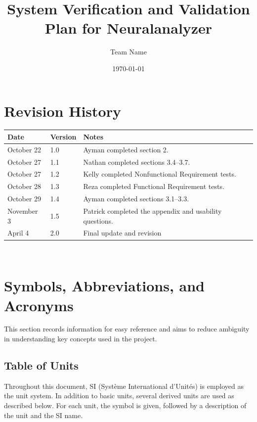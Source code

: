 \documentclass[12pt, titlepage]{article}
\newcommand{\progname}{Neuralanalyzer}
\newcommand{\authname}{Team Name}
\begin{document}
\title{System Verification and Validation Plan for \progname{}} 
\author{\authname}
\date{\today}
	
\maketitle


\section*{Revision History}

\begin{tabularx}{\textwidth}{p{3cm}p{2cm}X}
\toprule
{\bf Date} & {\bf Version} & {\bf Notes} \\
\midrule
October 22 & 1.0 & Ayman completed section 2. \\
October 27 & 1.1 & Nathan completed sections 3.4–3.7. \\
October 27 & 1.2 & Kelly completed Nonfunctional Requirement tests. \\
October 28 & 1.3 & Reza completed Functional Requirement tests. \\
October 29 & 1.4 & Ayman completed sections 3.1–3.3. \\
November 3 & 1.5 & Patrick completed the appendix and usability questions. \\
April 4 & 2.0 & Final update and revision \\
\bottomrule
\end{tabularx}

~\\

\newpage

\tableofcontents

\listoftables

\newpage

\section{Symbols, Abbreviations, and Acronyms}
This section records information for easy reference and aims to reduce ambiguity in understanding key concepts used in the project.

\subsection{Table of Units}

Throughout this document, SI (Système International d'Unités) is employed as the unit system. In addition to basic units, several derived units are used as described below. For each unit, the symbol is given, followed by a description of the unit and the SI name.
\end{document}
